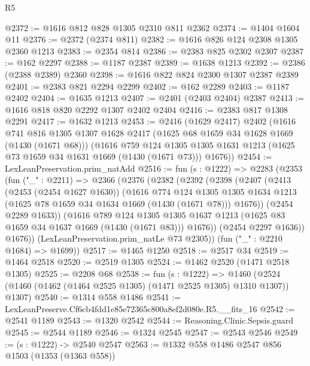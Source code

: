 \begin{lexlean}{R5}
\begin{coremodule}
@2372 := @1616 @812 @828 @1305 @2310 @811 @2362
@2374 := @1404 @1604 @11
@2376 := @2372 (@2374 @811)
@2382 := @1616 @826 @124 @2308 @1305 @2360 @1213
@2383 := @2354 @814
@2386 := @2383 @825 @2302 @2307
@2387 := @162 @2297
@2388 := @1187 @2387
@2389 := @1638 @1213
@2392 := @2386 (@2388 @2389) @2360
@2398 := @1616 @822 @824 @2300 @1307 @2387 @2389
@2401 := @2383 @821 @2294 @2299
@2402 := @162 @2289
@2403 := @1187 @2402
@2404 := @1635 @1213
@2407 := @2401 (@2403 @2404) @2387
@2413 := @1616 @818 @820 @2292 @1307 @2402 @2404
@2416 := @2383 @817 @1308 @2291
@2417 := @1632 @1213
@2453 := @2416
    (@1629 @2417)
    @2402
    (@1616
      @741
      @816
      @1305
      @1307
      @1628
      @2417
      (@1625 @68 @1659 @34 @1628 @1669 (@1430 (@1671 @68)))
      (@1616
        @759
        @124
        @1305
        @1305
        @1631
        @1213
        (@1625 @73 @1659 @34 @1631 @1669 (@1430 (@1671 @73)))
        @1676))
@2454 := LexLeanPreservation.prim_natAdd
@2516 := fun (s : @1222) =>
  @2283
    (@2353
      (fun ("_" : @2211) =>
      @2366
        (@2376
          (@2382
            (@2392
              (@2398
                (@2407
                  (@2413
                    (@2453 (@2454 @1627 @1630))
                    (@1616
                      @774
                      @124
                      @1305
                      @1305
                      @1634
                      @1213
                      (@1625 @78 @1659 @34 @1634 @1669 (@1430 (@1671 @78)))
                      @1676))
                  (@2454 @2289 @1633))
                (@1616
                  @789
                  @124
                  @1305
                  @1305
                  @1637
                  @1213
                  (@1625 @83 @1659 @34 @1637 @1669 (@1430 (@1671 @83)))
                  @1676))
              (@2454 @2297 @1636))
            @1676))
        (LexLeanPreservation.prim_natLe @73 @2305))
      (fun ("_" : @2210 @1684) => @1699))
@2517 := @1465 @1250
@2518 := @2517 @34
@2519 := @1464 @2518
@2520 := @2519 @1305
@2524 := @1462 @2520 (@1471 @2518 @1305)
@2525 := @2208 @68
@2538 := fun (s : @1222) =>
  @1460 (@2524 (@1460 (@1462 (@1464 @2525 @1305) (@1471 @2525 @1305) @1310 @1307)) @1307)
@2540 := @1314 @558 @1486
@2541 := LexLeanPreserve.Cf6cb4fdd1e85e72365c800a8ef2d080e.R5.__fits_16
@2542 := @2541 @1189
@2543 := @1320 @2542
@2544 := Reasoning.Clinic.Sepsis.guard
@2545 := @2544 @1189
@2546 := @1324 @2545
@2547 := @2543 @2546
@2549 := (s : @1222) -> @2540 @2547
@2563 := @1332
    @558
    @1486
    @2547
    @856
    @1503
    (@1353 (@1363 @558))

\end{coremodule}
\end{lexlean}
